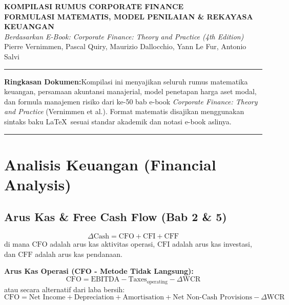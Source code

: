 \documentclass[10pt,a4paper]{article}
\newcommand{\takeaway}[2]{%
  \vspace{6pt}\noindent\colorbox{calloutbg}{%
    \parbox{\dimexpr\textwidth-2\fboxsep\relax}{%
      \vspace{3pt}\textbf{\color{primary}#1:}\hspace{0.5em}#2\vspace{3pt}%
    }%
  }\vspace{6pt}%
}
\begin{document}
\begin{center}
    {\LARGE\bfseries\color{primary} KOMPILASI RUMUS CORPORATE FINANCE}\\[4pt]
    {\large\bfseries\color{secondary} FORMULASI MATEMATIS, MODEL PENILAIAN \& REKAYASA KEUANGAN}\\[6pt]
    {\normalsize\itshape Berdasarkan E-Book: Corporate Finance: Theory and Practice (4th Edition)}\\
    {\small Pierre Vernimmen, Pascal Quiry, Maurizio Dallocchio, Yann Le Fur, Antonio Salvi}\\[8pt]
    \rule{\textwidth}{1pt}
\end{center}

\takeaway{Ringkasan Dokumen}{Kompilasi ini menyajikan seluruh rumus matematika keuangan, persamaan akuntansi manajerial, model penetapan harga aset modal, dan formula manajemen risiko dari ke-50 bab e-book \textit{Corporate Finance: Theory and Practice} (Vernimmen et al.). Format matematis disajikan menggunakan sintaks baku \LaTeX\ sesuai standar akademik dan notasi e-book aslinya.}

\tableofcontents
\vspace{10pt}
\rule{\textwidth}{0.5pt}

\section{Analisis Keuangan (Financial Analysis)}

\subsection{Arus Kas \& Free Cash Flow (Bab 2 \& 5)}

\begin{equation}
\Delta\text{Cash} = \text{CFO} + \text{CFI} + \text{CFF}
\end{equation}
di mana $\text{CFO}$ adalah arus kas aktivitas operasi, $\text{CFI}$ adalah arus kas investasi, dan $\text{CFF}$ adalah arus kas pendanaan.

\textbf{Arus Kas Operasi (CFO - Metode Tidak Langsung):}
\begin{equation}
\text{CFO} = \text{EBITDA} - \text{Taxes}_{\text{operating}} - \Delta\text{WCR}
\end{equation}
atau secara alternatif dari laba bersih:
\begin{equation}
\text{CFO} = \text{Net Income} + \text{Depreciation} + \text{Amortisation} + \text{Net Non-Cash Provisions} - \Delta\text{WCR}
\end{equation}
\end{document}
